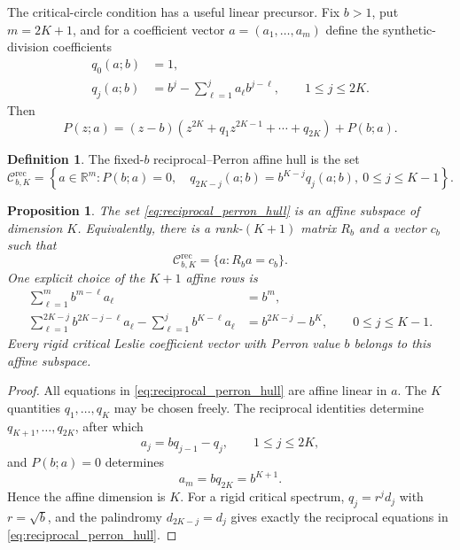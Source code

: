 \documentclass[11pt]{amsart}
\numberwithin{equation}{section}
\theoremstyle{plain}
\newtheorem{proposition}[theorem]{Proposition}
\theoremstyle{definition}
\newtheorem{definition}[theorem]{Definition}
\theoremstyle{remark}
\begin{document}
The critical-circle condition has a useful linear precursor.  Fix $b>1$, put $m=2K+1$, and for a coefficient vector $a=(a_1,\ldots,a_m)$ define the synthetic-division coefficients
\begin{align}
q_0(a;b)&=1,
\label{eq:q_zero}\\
q_j(a;b)&=b^j-\sum_{\ell=1}^{j}a_\ell b^{j-\ell},
\qquad 1\leq j\leq 2K.
\label{eq:q_definition}
\end{align}
Then
\begin{equation}
P(z;a)
=(z-b)\left(
 z^{2K}+q_1z^{2K-1}+\cdots+q_{2K}
\right)+P(b;a).
\label{eq:synthetic_division_identity}
\end{equation}

\begin{definition}
\label{def:reciprocal_perron_hull}
The fixed-$b$ reciprocal--Perron affine hull is the set
\begin{equation}
\mathcal C^{\mathrm{rec}}_{b,K}
=
\left\{
a\in\mathbb R^m:
P(b;a)=0,
\quad
q_{2K-j}(a;b)=b^{K-j}q_j(a;b),\ 0\leq j\leq K-1
\right\}.
\label{eq:reciprocal_perron_hull}
\end{equation}
\end{definition}

\begin{proposition}
\label{prop:reciprocal_affine_dimension}
The set \eqref{eq:reciprocal_perron_hull} is an affine subspace of dimension $K$.  Equivalently, there is a rank-$(K+1)$ matrix $R_b$ and a vector $c_b$ such that
\begin{equation}
\mathcal C^{\mathrm{rec}}_{b,K}
=\{a:R_ba=c_b\}.
\label{eq:Rb_affine_form}
\end{equation}
One explicit choice of the $K+1$ affine rows is
\begin{align}
\sum_{\ell=1}^{m}b^{m-\ell}a_\ell
&=b^m,
\label{eq:Rb_perron_row}\\
\sum_{\ell=1}^{2K-j}b^{2K-j-\ell}a_\ell
-
\sum_{\ell=1}^{j}b^{K-\ell}a_\ell
&=b^{2K-j}-b^K,
\qquad 0\leq j\leq K-1.
\label{eq:Rb_reciprocal_rows}
\end{align}
Every rigid critical Leslie coefficient vector with Perron value $b$ belongs to this affine subspace.
\end{proposition}

\begin{proof}
All equations in \eqref{eq:reciprocal_perron_hull} are affine linear in $a$.  The $K$ quantities $q_1,\ldots,q_K$ may be chosen freely.  The reciprocal identities determine $q_{K+1},\ldots,q_{2K}$, after which
\begin{equation}
a_j=bq_{j-1}-q_j,
\qquad 1\leq j\leq2K,
\label{eq:a_from_q}
\end{equation}
and $P(b;a)=0$ determines
\begin{equation}
a_m=bq_{2K}=b^{K+1}.
\label{eq:a_m_from_q}
\end{equation}
Hence the affine dimension is $K$.  For a rigid critical spectrum, $q_j=r^jd_j$ with $r=\sqrt b$, and the palindromy $d_{2K-j}=d_j$ gives exactly the reciprocal equations in \eqref{eq:reciprocal_perron_hull}.
\end{proof}
\end{document}
